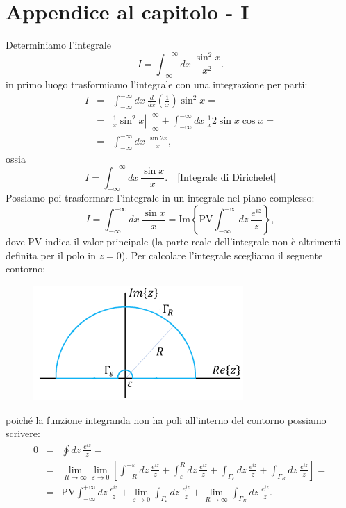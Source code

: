 \documentclass[a4paper,12pt,oneside]{book}
\begin{document}
\section*{Appendice al capitolo - I}
Determiniamo l'integrale
\begin{equation}
I= \int _{-\infty} ^{-\infty} dx\ \frac{\sin ^2 x}{x^2}.
\end{equation}
in primo luogo trasformiamo l'integrale con una integrazione per parti:
\begin{eqnarray}
I &=& \int _{-\infty} ^{-\infty} dx\ \frac{d}{dx}\left(\frac{1}{x}\right)\sin ^2 x = \nonumber \\
&=& \left. \frac{1}{x}\sin ^2 x\right\vert _{-\infty} ^{-\infty} +\int _{-\infty} ^{-\infty} dx\ \frac{1}{x} 2 \sin x \cos x =\\
&=& \int _{-\infty} ^{-\infty} dx\ \frac{\sin 2 x}{x}, \nonumber
\end{eqnarray}
ossia
\begin{equation}
I= \int _{-\infty} ^{-\infty} dx\ \frac{\sin  x}{x}. \quad \textrm{[Integrale di Dirichelet]}
\end{equation}
Possiamo poi trasformare l'integrale in un integrale nel piano complesso:
\begin{equation}
I= \int _{-\infty} ^{-\infty} dx\ \frac{\sin  x}{x}= \textrm{Im}\left\{\textrm{PV} \int _{-\infty} ^{-\infty} dz\ \frac{e^{iz}}{z}\right\},
\label{eq:cap15_14}
\end{equation}
dove PV indica il valor principale (la parte reale dell'integrale non è altrimenti definita per il polo in $z=0$). Per calcolare l'integrale scegliamo il seguente contorno:
\begin{figure}[!htbp]
\begin{center}
\includegraphics[width=8cm]{immagini/cap_15/fig_15_4.png}
\end{center}
\end{figure}
poiché la funzione integranda non ha poli all'interno del contorno possiamo scrivere:
\begin{eqnarray}
0 & = & \oint  dz\ \frac{e^{iz}}{z} = \nonumber \\
&=& \lim _{R\rightarrow \infty} \lim _{\varepsilon\rightarrow 0} \left[ \int _{-R} ^{-\varepsilon}dz\ \frac{e^{iz}}{z}+\int _{\varepsilon} ^{R}dz\ \frac{e^{iz}}{z}+\int _{\Gamma _{\varepsilon}} dz\ \frac{e^{iz}}{z} +\int _{\Gamma _{R}} dz\ \frac{e^{iz}}{z}\right] = \nonumber\\
&= &\textrm{PV}\int _{-\infty} ^{+\infty}dz\ \frac{e^{iz}}{z}+ \lim _{\varepsilon\rightarrow 0}  \int _{\Gamma _{\varepsilon}} dz\ \frac{e^{iz}}{z}+\lim _{R\rightarrow \infty}\int _{\Gamma _{R}} dz\ \frac{e^{iz}}{z}.
\label{eq:cap15_15}
\end{eqnarray}
\end{document}
